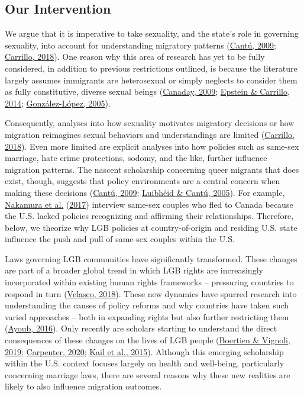 \documentclass[
  11pt,
]{article}
\begin{document}
\hypertarget{our-intervention}{%
\subsection{Our Intervention}\label{our-intervention}}

We argue that it is imperative to take sexuality, and the state's role in governing sexuality, into account for understanding migratory patterns (\protect\hyperlink{ref-cantu_2009}{Cantú, 2009}; \protect\hyperlink{ref-carrillo_2018}{Carrillo, 2018}). One reason why this area of research has yet to be fully considered, in addition to previous restrictions outlined, is because the literature largely assumes immigrants are heterosexual or simply neglects to consider them as fully constitutive, diverse sexual beings (\protect\hyperlink{ref-canaday_2009}{Canaday, 2009}; \protect\hyperlink{ref-epstein_2014}{Epstein \& Carrillo, 2014}; \protect\hyperlink{ref-gonzalez-lopez_2005}{González-López, 2005}).

Consequently, analyses into how sexuality motivates migratory decisions or how migration reimagines sexual behaviors and understandings are limited (\protect\hyperlink{ref-carrillo_2018}{Carrillo, 2018}). Even more limited are explicit analyses into how policies such as same-sex marriage, hate crime protections, sodomy, and the like, further influence migration patterns. The nascent scholarship concerning queer migrants that does exist, though, suggests that policy environments are a central concern when making these decisions (\protect\hyperlink{ref-cantu_2009}{Cantú, 2009}; \protect\hyperlink{ref-luibheid_2005}{Luibhéid \& Cantú, 2005}). For example, \protect\hyperlink{ref-nakamura_2017}{Nakamura et al.} (\protect\hyperlink{ref-nakamura_2017}{2017}) interview same-sex couples who fled to Canada because the U.S. lacked policies recognizing and affirming their relationships. Therefore, below, we theorize why LGB policies at country-of-origin and residing U.S. state influence the push and pull of same-sex couples within the U.S.

Laws governing LGB communities have significantly transformed. These changes are part of a broader global trend in which LGB rights are increasingly incorporated within existing human rights frameworks -- pressuring countries to respond in turn (\protect\hyperlink{ref-velasco_2018}{Velasco, 2018}). These new dynamics have spurred research into understanding the causes of policy reforms and why countries have taken such varied approaches -- both in expanding rights but also further restricting them (\protect\hyperlink{ref-ayoub_2016}{Ayoub, 2016}). Only recently are scholars starting to understand the direct consequences of these changes on the lives of LGB people (\protect\hyperlink{ref-boertien_2019}{Boertien \& Vignoli, 2019}; \protect\hyperlink{ref-carpenter_2020}{Carpenter, 2020}; \protect\hyperlink{ref-kail_2015}{Kail et al., 2015}). Although this emerging scholarship within the U.S. context focuses largely on health and well-being, particularly concerning marriage laws, there are several reasons why these new realities are likely to also influence migration outcomes.
\end{document}

